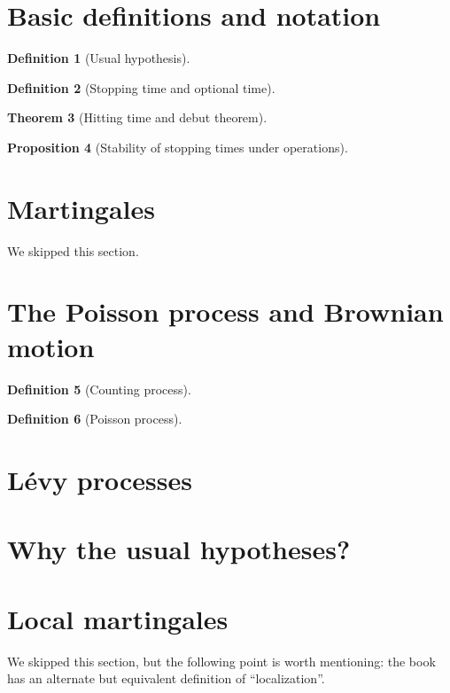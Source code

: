 \documentclass[openany,oneside]{book}
\newtheorem{thm}{Theorem}[section]
\newtheorem{prop}[thm]{Proposition}
\theoremstyle{definition}
\newtheorem{defn}[thm]{Definition}
\theoremstyle{remark}
\begin{document}
\section{Basic definitions and notation}

\begin{defn}[Usual hypothesis]

\end{defn}


\begin{defn}[Stopping time and optional time]

\end{defn}


\begin{thm}[Hitting time and debut theorem]

\end{thm}


\begin{prop}[Stability of stopping times under operations]

\end{prop}

\section{Martingales}
We skipped this section.


\section{The Poisson process and Brownian motion}

\begin{defn}[Counting process]

\end{defn}


\begin{defn}[Poisson process]

\end{defn}


\section{L\'evy processes}


\section{Why the usual hypotheses?}

\section{Local martingales}
We skipped this section, but the following point is worth mentioning: the book has an alternate but equivalent definition of ``localization''.
\end{document}
